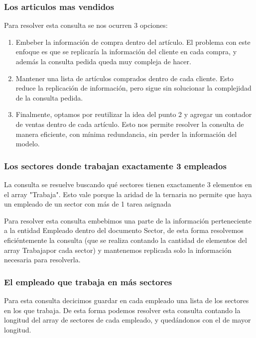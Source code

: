 \subsubsection{Los articulos mas vendidos}

Para resolver esta consulta se nos ocurren 3 opciones:

\begin{enumerate}
	\item Embeber la informaci\'on de compra dentro del art\'iculo. El problema con este enfoque es que se replicar\'ia la informaci\'on del cliente en cada compra, y adem\'as la consulta pedida queda muy compleja de hacer.

	\item Mantener una lista de art\'iculos comprados dentro de cada cliente. Esto reduce la replicaci\'on de informaci\'on, pero sigue sin solucionar la complejidad de la consulta pedida.

	\item Finalmente, optamos por reutilizar la idea del punto 2 y agregar un contador de ventas dentro de cada art\'iculo. Esto nos permite resolver la consulta de manera eficiente, con m\'inima redundancia, sin perder la informaci\'on del modelo.
\end{enumerate}

\subsubsection{Los sectores donde trabajan exactamente 3 empleados}

La consulta se resuelve buscando qu\'e sectores tienen exactamente 3 elementos en el array "Trabaja". Esto vale porque la aridad de la ternaria no permite que haya un empleado de un sector con m\'as de 1 tarea asignada

Para resolver esta consulta embebimos una parte de la informaci\'on perteneciente a la entidad Empleado dentro del documento Sector, de esta forma resolvemos efici\'entemente la consulta (que se realiza contando la cantidad de elementos del array Trabajapor cada sector) y mantenemos replicada solo la informaci\'on necesaria para resolverla.

\subsubsection{El empleado que trabaja en m\'as sectores}

Para esta consulta decicimos guardar en cada empleado una lista de los sectores en los que trabaja. De esta forma podemos resolver esta consulta contando la longitud del array de sectores de cada empleado, y qued\'andonos con el de mayor longitud. 


